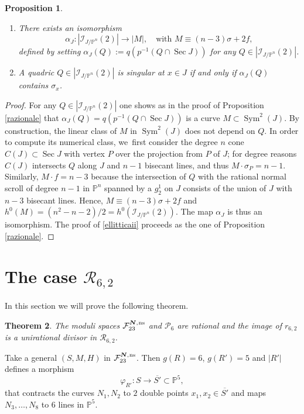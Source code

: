 \documentclass[11pt]{article}
\newcommand{\skpt}{\smallskip}
\newcommand{\ns}{{\mkern1mu\mathrm{ns}}}
\newcommand{\bN}{\boldsymbol{N}}
\theoremstyle{plain}
\newtheorem{thm}{Theorem}[section]
\newtheorem{prop}[thm]{Proposition}
\theoremstyle{definition}
\DeclareMathOperator{\Sec}{Sec}
\DeclareMathOperator{\Sym}{Sym}
\newcommand\PP{{\mathbb P}}
\newcommand\F{{\mathcal F}}
\newcommand\I{{\mathcal I}}
\renewcommand\P{{\mathcal P}}
\newcommand\R{{\mathcal R}}
\begin{document}
\skpt
\begin{prop}\label{ellittica}
\begin{enumerate}
\item\label{ellitticai}
There exists an isomorphism
\[
\alpha_J: |\I_{J/\PP^n}(2)|\to |M|, \quad\text{with }M\equiv (n-3)\sigma+2f,
\]
defined by setting $\alpha_J(Q):=q(p^{-1}(Q\cap\Sec J))$ for any $Q\in |\I_{J/\PP^n}(2)|$.
\item\label{ellitticaii}
A quadric $Q\in |\I_{J/\PP^n}(2)|$ is singular at $x\in J$ if and only if $\alpha_J(Q)$ contains $\sigma _x$.
\end{enumerate}
\end{prop}

\begin{proof}
For any $Q\in |\I_{J/\PP^n}(2)|$ one shows as in the proof of Proposition \ref{razionale} that $\alpha_J(Q)=q(p^{-1}(Q\cap\Sec J))$ is a curve $M\subset\Sym^2(J)$. By construction, the linear class of $M$ in $\Sym^2(J)$ does not depend on $Q$. In order to compute its numerical class, we~first consider the degree $n$ cone $C(J)\subset \Sec J$ with vertex $P$ over the projection from $P$ of $J$; for degree reasons $C(J)$ intersects $Q$ along $J$ and $n-1$ bisecant lines, and thus $M\cdot \sigma_P=n-1$. Similarly,  $M\cdot f=n-3$ because the intersection of $Q$ with the rational normal scroll of degree $n-1$ in $\PP^n$ spanned by a $g^1_2$ on $J$ consists of the union of $J$ with $n-3$ bisecant lines. Hence, $M\equiv (n-3)\sigma+2f$ and $h^0(M)=(n^2-n-2)/2=h^0(\I_{J/\PP^n}(2))$. The map $\alpha_J$ is thus an isomorphism. The proof of \eqref{ellitticaii} proceeds as the one of Proposition \ref{razionale}.
\end{proof}

\section{The case \texorpdfstring{$\R_{6,2}$}{R}}

In this section we will prove the following theorem.

\begin{thm}\label{seidue}
The moduli spaces $\F_{23}^{\bN,\ns}$ and $\P_{6}$ are rational and the image of $r_{6,2}$ is a unirational divisor in $\R_{6,2}$.
\end{thm}

Take a general $(S,M,H)$ in $\F_{23}^{\bN,\ns}$. Then $g(R)=6$, $g(R')=5$ and $|R'|$ defines a morphism
\[
\varphi_{R'}:S\to \overline{S'}\subset \PP^5,
\]
that contracts the curves $N_1,N_2$ to $2$ double points $x_1,x_2\in \overline{S'}$ and maps $N_3,\ldots,N_8$ to $6$ lines in $\PP^5$.
\end{document}
